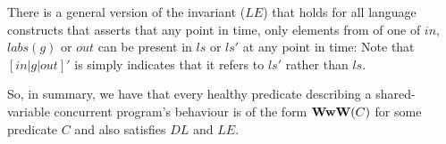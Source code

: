 There is a general version of the invariant ($LE$) that holds
for all language constructs that asserts that any point in time,
only elements from of one of $in$, $labs(g)$ or $out$
can be present in $ls$ or $ls'$ at any point in time:
Note that $[in|g|out]'$ is simply indicates that it refers to $ls'$
rather than $ls$.

So, in summary, we have that every healthy predicate describing
a shared-variable concurrent program's behaviour is of the form $\mathbf{WwW}(C)$
for some predicate $C$ and also satisfies $DL$ and  $LE$.
